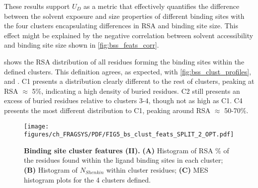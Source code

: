 These results support $U_{D}$ as a metric that effectively quantifies the difference between the solvent exposure and size properties of different binding sites with the four clusters encapsulating differences in RSA and binding site size. This effect might be explained by the negative correlation between solvent accessibility and binding site size shown in \autoref{fig:bss_feats_corr}.


 shows the RSA distribution of all residues forming the binding sites within the defined clusters. This definition agrees, as expected, with \autoref{fig:bss_clust_profiles}, and  . C1 presents a distribution clearly different to the rest of clusters, peaking at RSA $\approx$ 5\%, indicating a high density of buried residues. C2 still presents an excess of buried residues relative to clusters 3-4, though not as high as C1. C4 presents the most different distribution to C1, peaking around RSA $\approx$ 50-70\%.

\begin{figure}[ht!]
    \centering
    \texttt{[image: figures/ch\_FRAGSYS/PDF/FIG5\_bs\_clust\_feats\_SPLIT\_2\_OPT.pdf]}
    \caption[Binding site cluster features (II)]{\textbf{Binding site cluster features (II).} \textbf{(A)} Histogram of RSA \% of the residues found within the ligand binding sites in each cluster; \textbf{(B)} Histogram of $N_{Shenkin}$ within cluster residues; \textbf{(C)} MES histogram plots for the 4 clusters defined.}
    \label{fig:bs_clusts_feats_2}
\end{figure}

